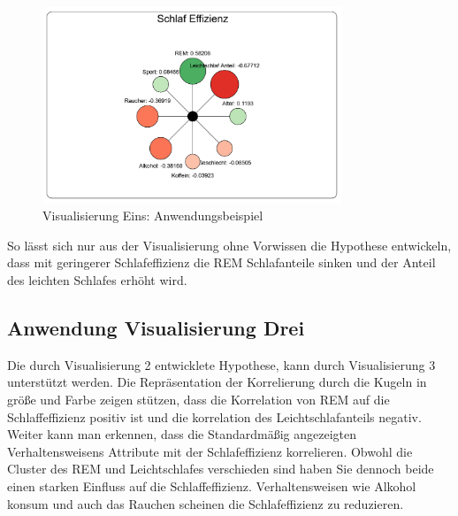 \documentclass[usegeometry=true]{scrartcl}
\begin{document}
\begin{figure}[h]

  \centering
  \includegraphics[width = 0.8\textwidth]{Bsp_ImpactGraph.JPG}
  \caption{Visualisierung Eins: Anwendungsbeispiel}

  
\end{figure}

So lässt sich nur aus der Visualisierung ohne Vorwissen die Hypothese entwickeln, dass mit geringerer Schlafeffizienz die REM Schlafanteile sinken und der Anteil des leichten Schlafes erhöht wird.

\subsection{Anwendung Visualisierung Drei}

Die durch Visualisierung 2 entwicklete Hypothese, kann durch Visualisierung 3 unterstützt werden. 
Die Repräsentation der Korrelierung durch die Kugeln  in größe und Farbe zeigen stützen, dass die Korrelation von REM auf die Schlaffeffizienz positiv ist und die korrelation des Leichtschlafanteils negativ. 
Weiter kann man erkennen, dass die Standardmäßig angezeigten Verhaltensweisens Attribute mit der Schlafeffizienz korrelieren. 
Obwohl die Cluster des REM und Leichtschlafes verschieden sind haben Sie dennoch beide einen starken Einfluss auf die Schlaffeffizienz.
Verhaltensweisen wie Alkohol konsum und auch das Rauchen scheinen die Schlafeffizienz zu reduzieren.
\end{document}

